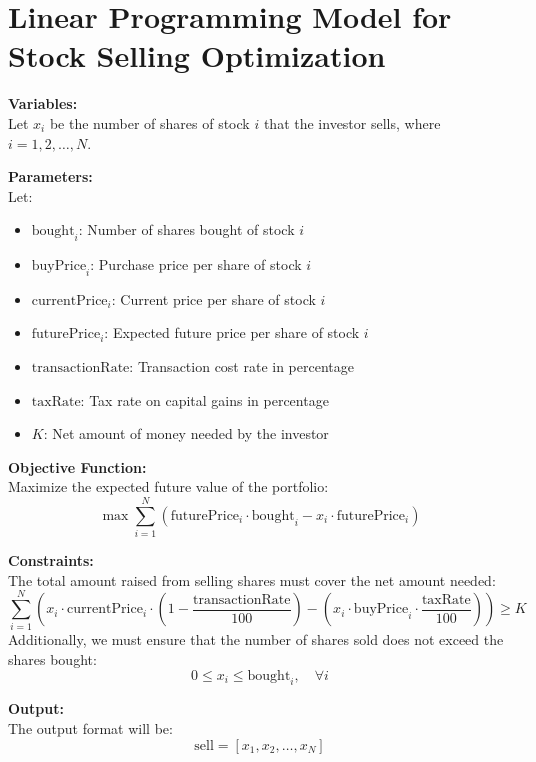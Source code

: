 \documentclass{article}
\begin{document}
\section*{Linear Programming Model for Stock Selling Optimization}

\textbf{Variables:} \\
Let \( x_i \) be the number of shares of stock \( i \) that the investor sells, where \( i = 1, 2, \ldots, N \).

\textbf{Parameters:} \\
Let:
\begin{itemize}
    \item \( \text{bought}_i \): Number of shares bought of stock \( i \) \\
    \item \( \text{buyPrice}_i \): Purchase price per share of stock \( i \) \\
    \item \( \text{currentPrice}_i \): Current price per share of stock \( i \) \\
    \item \( \text{futurePrice}_i \): Expected future price per share of stock \( i \) \\
    \item \( \text{transactionRate} \): Transaction cost rate in percentage \\
    \item \( \text{taxRate} \): Tax rate on capital gains in percentage \\
    \item \( K \): Net amount of money needed by the investor
\end{itemize}

\textbf{Objective Function:} \\
Maximize the expected future value of the portfolio:
\[
\max \sum_{i=1}^{N} \left( \text{futurePrice}_i \cdot \text{bought}_i - x_i \cdot \text{futurePrice}_i \right)
\]

\textbf{Constraints:} \\
The total amount raised from selling shares must cover the net amount needed:
\[
\sum_{i=1}^{N} \left( x_i \cdot \text{currentPrice}_i \cdot (1 - \frac{\text{transactionRate}}{100}) - (x_i \cdot \text{buyPrice}_i \cdot \frac{\text{taxRate}}{100}) \right) \geq K
\]
Additionally, we must ensure that the number of shares sold does not exceed the shares bought:
\[
0 \leq x_i \leq \text{bought}_i, \quad \forall i
\]

\textbf{Output:} \\
The output format will be:
\[
\text{sell} = [x_1, x_2, \ldots, x_N]
\]
\end{document}
